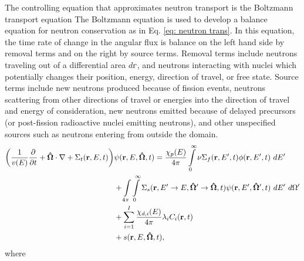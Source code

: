 The controlling
equation that approximates neutron transport is the Boltzmann transport equation \cite{duderstadt}
The Boltzmann equation is used to develop a balance equation for neutron conservation as in Eq. 
\ref{eq: neutron trans}.  In this equation, the time rate of change in the angular flux is balance on the left
hand side by removal terms and on the right by source terms.  Removal terms include neutrons traveling out
of a differential area $d\mathbb{r}$, and neutrons interacting with nuclei which potentially changes their
position, energy, direction of travel, or free state.  Source terms include new neutrons produced because of
fission events, neutrons scattering from other directions of travel or energies into the direction of travel
and energy of consideration, new neutrons emitted because of delayed precursors (or post-fission radioactive
nuclei emitting neutrons), and other unspecified sources such as neutrons entering from outside the domain.
\begin{align}\label{eq: neutron trans}
  \qty(\frac{1}{v(E)}\pdv{}{t} + \mathbf{\hat\Omega}\cdot\nabla +
   \Sigma_t(\mathbf{r},E,t))&\psi(\mathbf{r},E,\mathbf{\hat\Omega},t) =
  \frac{\chi_p(E)}{4\pi}\int\limits_{0}^\infty \nu\Sigma_f(\mathbf{r},E',t)\phi(\mathbf{r},E',t)\ dE' \nonumber \\
  & + \int\limits_{4\pi}^{}\int\limits_{0}^\infty \Sigma_s(\mathbf{r},E'\to E,\mathbf{\hat\Omega'\to\hat\Omega},t)
  \psi(\mathbf{r},E',\mathbf{\hat\Omega'},t)  \ dE'\ d\Omega' \nonumber \\
  & + \sum_{i=1}^I \frac{\chi_{d,i}(E)}{4\pi}\lambda_iC_i(\mathbf{r},t) \nonumber \\
  & + s(\mathbf{r},E,\mathbf{\hat\Omega},t),
\end{align}
where
